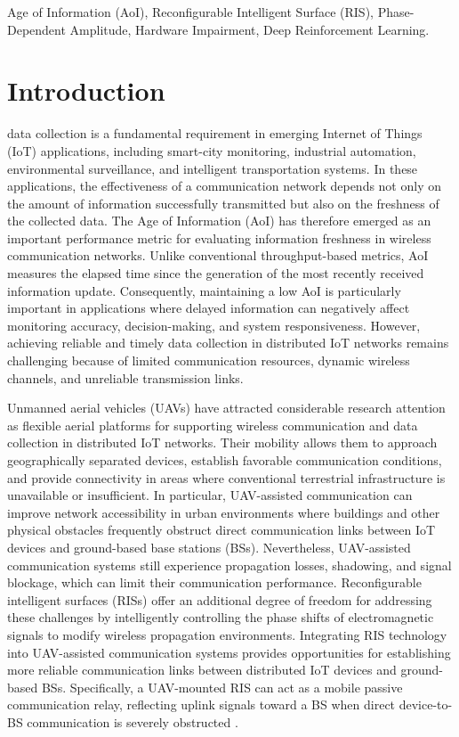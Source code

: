 \documentclass[journal]{IEEEtran}
\begin{document}
\begin{IEEEkeywords}
Age of Information (AoI), Reconfigurable Intelligent Surface (RIS), Phase-Dependent Amplitude, Hardware Impairment, Deep Reinforcement Learning.
\end{IEEEkeywords}

\section{Introduction}
\label{sec:intro}

 data collection is a fundamental requirement in emerging Internet of Things (IoT) applications, including smart-city monitoring, industrial automation, environmental surveillance, and intelligent transportation systems. In these applications, the effectiveness of a communication network depends not only on the amount of information successfully transmitted but also on the freshness of the collected data. The Age of Information (AoI) \cite{kaul2012real} has therefore emerged as an important performance metric for evaluating information freshness in wireless communication networks. Unlike conventional throughput-based metrics, AoI measures the elapsed time since the generation of the most recently received information update. Consequently, maintaining a low AoI is particularly important in applications where delayed information can negatively affect monitoring accuracy, decision-making, and system responsiveness. However, achieving reliable and timely data collection in distributed IoT networks remains challenging because of limited communication resources, dynamic wireless channels, and unreliable transmission links.

Unmanned aerial vehicles (UAVs) have attracted considerable research attention as flexible aerial platforms for supporting wireless communication and data collection in distributed IoT networks. Their mobility allows them to approach geographically separated devices, establish favorable communication conditions, and provide connectivity in areas where conventional terrestrial infrastructure is unavailable or insufficient. In particular, UAV-assisted communication can improve network accessibility in urban environments where buildings and other physical obstacles frequently obstruct direct communication links between IoT devices and ground-based base stations (BSs). Nevertheless, UAV-assisted communication systems still experience propagation losses, shadowing, and signal blockage, which can limit their communication performance. Reconfigurable intelligent surfaces (RISs) offer an additional degree of freedom for addressing these challenges by intelligently controlling the phase shifts of electromagnetic signals to modify wireless propagation environments. Integrating RIS technology into UAV-assisted communication systems provides opportunities for establishing more reliable communication links between distributed IoT devices and ground-based BSs. Specifically, a UAV-mounted RIS can act as a mobile passive communication relay, reflecting uplink signals toward a BS when direct device-to-BS communication is severely obstructed \cite{wu2019intelligent}.
\end{document}
